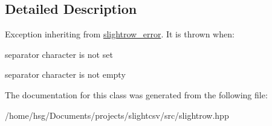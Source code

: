 \subsection{Detailed Description}
Exception inheriting from \hyperlink{classutils_1_1slightrow__error}{slightrow\+\_\+error}. It is thrown when\+:
\begin{DoxyItemize}
\item separator character is not set
\item separator character is not empty 
\end{DoxyItemize}

The documentation for this class was generated from the following file\+:\begin{DoxyCompactItemize}
\item 
/home/hsg/\+Documents/projects/slightcsv/src/slightrow.\+hpp\end{DoxyCompactItemize}
